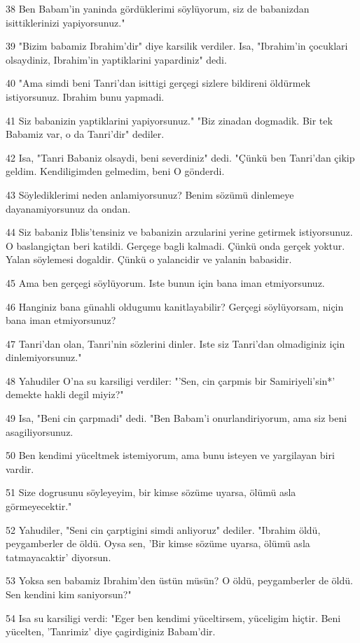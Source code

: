 \par 38 Ben Babam'in yaninda gördüklerimi söylüyorum, siz de babanizdan isittiklerinizi yapiyorsunuz."
\par 39 "Bizim babamiz Ibrahim'dir" diye karsilik verdiler. Isa, "Ibrahim'in çocuklari olsaydiniz, Ibrahim'in yaptiklarini yapardiniz" dedi.
\par 40 "Ama simdi beni Tanri'dan isittigi gerçegi sizlere bildireni öldürmek istiyorsunuz. Ibrahim bunu yapmadi.
\par 41 Siz babanizin yaptiklarini yapiyorsunuz." "Biz zinadan dogmadik. Bir tek Babamiz var, o da Tanri'dir" dediler.
\par 42 Isa, "Tanri Babaniz olsaydi, beni severdiniz" dedi. "Çünkü ben Tanri'dan çikip geldim. Kendiligimden gelmedim, beni O gönderdi.
\par 43 Söylediklerimi neden anlamiyorsunuz? Benim sözümü dinlemeye dayanamiyorsunuz da ondan.
\par 44 Siz babaniz Iblis'tensiniz ve babanizin arzularini yerine getirmek istiyorsunuz. O baslangiçtan beri katildi. Gerçege bagli kalmadi. Çünkü onda gerçek yoktur. Yalan söylemesi dogaldir. Çünkü o yalancidir ve yalanin babasidir.
\par 45 Ama ben gerçegi söylüyorum. Iste bunun için bana iman etmiyorsunuz.
\par 46 Hanginiz bana günahli oldugumu kanitlayabilir? Gerçegi söylüyorsam, niçin bana iman etmiyorsunuz?
\par 47 Tanri'dan olan, Tanri'nin sözlerini dinler. Iste siz Tanri'dan olmadiginiz için dinlemiyorsunuz."
\par 48 Yahudiler O'na su karsiligi verdiler: "'Sen, cin çarpmis bir Samiriyeli'sin*' demekte hakli degil miyiz?"
\par 49 Isa, "Beni cin çarpmadi" dedi. "Ben Babam'i onurlandiriyorum, ama siz beni asagiliyorsunuz.
\par 50 Ben kendimi yüceltmek istemiyorum, ama bunu isteyen ve yargilayan biri vardir.
\par 51 Size dogrusunu söyleyeyim, bir kimse sözüme uyarsa, ölümü asla görmeyecektir."
\par 52 Yahudiler, "Seni cin çarptigini simdi anliyoruz" dediler. "Ibrahim öldü, peygamberler de öldü. Oysa sen, 'Bir kimse sözüme uyarsa, ölümü asla tatmayacaktir' diyorsun.
\par 53 Yoksa sen babamiz Ibrahim'den üstün müsün? O öldü, peygamberler de öldü. Sen kendini kim saniyorsun?"
\par 54 Isa su karsiligi verdi: "Eger ben kendimi yüceltirsem, yüceligim hiçtir. Beni yücelten, 'Tanrimiz' diye çagirdiginiz Babam'dir.
